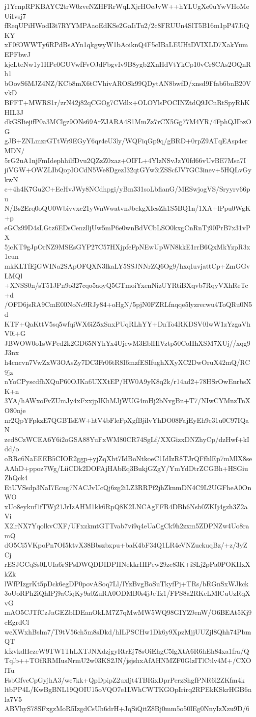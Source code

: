 j1YcnpRPKBAYC2trW0zveNZHFRrWqLXjrHOeJvW++hYLUgXe0uYwVHoMeUiIvsj7
fReqUPiHWodI3t7RYYMPAaoEdKSe2GaIiTu2/2c8FRUUn4SlT5B16m1pP47JiQKY
xF0fOWWTy6RPdBsAYn1qkgwyW1bAoiknQ4F5cIBaLEUHtDVIXLD7XakYumEPFbwJ
kjcLteNw1y1HPe0GUVwfFvOJdFbgvIv9B8ygb2XnHdVtYkCp10vCr8CAs2OQnRh1
bOovS6MJZ4NZ/KCb8mX6tCVhivAROSk99QDytAN8bwfD/xnsd9Ffab6bnB20VvkD
BFFT+MWRS1r/zrN42j82qCGOg7CVdlx+OLOYlsPOCINZtdQ9JCnRtSpyRhKHIL3J
dkGSIiejifP0a3MClgz9ONs69ArZJARA4S1MmZz7rCX5Gg77M4YR/4FphQJIbzOG
gJB+ZNLmzrGTtWr9EGyY6qr4eU3ly/WQFiqGp9q/gBRD+0rpZ9ATqEAsp4erMDN/
5rG2uA1njFmIdephhilfDvu2QZzZ0xaz+OIFL+4YlzNSvJzY0fd66vUvBE7Msa7I
jiVGW+OWZLIbQopIOCdN5We8DgezI32qtGYw3iZSScfJV7GC3inev+5HQLvGykwN
c+4h4K7Gu2C+EeHvJWy8NCdhpgi/yBm331soLbfianG/MESwjogVS/Sryyrv66pu
N/Bs2Erq0oQU0Wbivvxc21yWnWwatvnJbekgXIcsZh1S5BQ1n/1XA+lPpu0WgK+p
eGCz99D4sLGtz6EDsCenzlljUw5mP6e0wnBdVCbLSO0kxgCnRnTj90PrB7x31vPX
5jcKT9gJpOrNZ9MSEsGYP27C57HXjpfeFpNEwUpWN8kkE1rrB6QxMkYzpR3x1cun
mkKLTfEjGWINa2SApOFQXN3lkaLY5SSJNNrZQ6Og9/hxqIuvjattCp+ZmGGvLMQl
+XNSS0n/sT51JPn9o327cqo5aoyQ5GTmoiYxenNizUYRtiBXqvb7RqyVXhReTc+d
/OFD6jsRA9CmE00NoNc9RJy84+oHgN/5pjN0FZRLfnqqe5lyzrecwu4ToQRu0N5d
KTF+QaKttV5sq5wfqiWX6iZ5xSnxPUqRLhYY+DnTo4RKDSV0IwW1zYzgaVhV0i+G
JBWOW0o1sWPed2k2GD65NYhYx4UjewM3EblHlVztp50CoHhXSM7XUj//xqg9J3nx
h4cncvn7VwZxW3OAsZy7DC3Fr06tR8I6mzfESIfughXXyXC2DwOruX42mQ/RC9jz
nYoCPyscdfhXQuP60OJKa6UXXtEP/HW0A9yK8q2k/r14ad2+78HSrOwEnrbsXK+n
3YA/hAWxoFvZUmJy4xFxxjpIKhMJjWUG4mHj2bNvgBn+T7/NIwCYMnzTnXO80nje
nr2QpYFpkzE7QGBTsEW+htV4bFleFpXgfBjilvYhDO08FajEyEh9c31u0C97IQaN
zed8CzWCEA6Y6i2oGSA88YuFxWM80CR74SgLf/XXGizxDNZhyCp/dzHwf+kIdd/o
oRRc6NaEEEB5CIOR2ggp+yjZqXbt7IdBoNtkoeC1IdIzR8TJrQFfhlEp7mMlX8se
AAhD+ppoz7Wg/LiiCDk2DOFAjHAbEq3BukjGZgY/YmYdDtrZCGBh+HSGiuZhQck4
EtUVSsdp3NaI7Ecug7NACJvUcQj6zg2iLZ3RRPf2jhZknmDN4C9L2UGFheA0OnWO
xUo8eykuf1fTWj21JrIzAHM1kk6RpQ8K2LNCAgFFR4DBh6Nsb0ZKIj4gzh3Z2aVi
X2lrNX7YqolkvCXF/UFxzkmtGTTvab7vi9q4eUaCgCk9h2zxm5ZDPNZw4Uo8ramQ
dO5Ci5VKpoPn7OI5ktvX38Bbszbxpu+baK4bF34Q1LR4eVNZuckuqBz/+z/3yZCj
rESJGCqSs0LUIa6rSPsDWQDDIDPHNekkrHIPew29ze83K+iSLj2pPa0POKHxXkZk
lWfPIzgrKt5pDck6egDP0povASoq7Ll/lYzBvgBoSuTkyfPj+TRs/bRGnSxWJkck
3oUoRPh2iQhIPj9aCiqKy9a0ZuRA0ODMB0s4jJeTz1/FPS8a2RKeLMlCuUzRqXvG
mAO5CJTfCzJaGEZbIDEanOkLM7Z7qMwMW5WQ98GIYZ9enW/O6BEAt5Kj9cEgrdCl
wcXWxhBslm7/T9tV56ch5m8sDkd/hILPSCHw1Dk6y9XpzMjjUUZjl8Qhh74PbmQT
kfzvkdHczeW9TW1ThLXTJNXdzjgyRtrEj78sOiEhgC5lgXtA6R6hEh84xa1fra/Q
Tqlb++TOfRRMIusNrmU2w03KS2JN/jsjshxAfAHNMZF0GlzITlCtlv4M+/CXOlTu
FsbGfveCpGyjhA3/we7kk+QpDpipZ2uxljt4TBRixDprPerzShgfPNR6l2ZKfm4k
ltbPP4L/KwBgBNL19QOIU15oVQO7e1LWhCWTKGOpIrirq2RPEkKSkrHGB6nla7V5
ABVhyS78SFxgzMoR5IzgdCsUh6drH+JqSiQitZ8Bj0mm5o50lEg0NnyIzXzu9D/6

